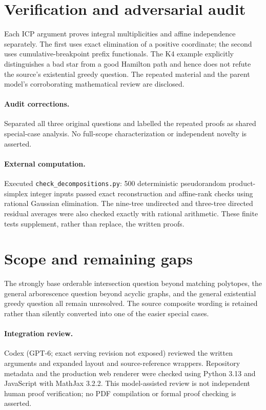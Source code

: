 \documentclass[11pt]{article}
\begin{document}
\section{Verification and adversarial audit}
Each ICP argument proves integral multiplicities and affine independence separately. The first uses exact elimination of a positive coordinate; the second uses cumulative-breakpoint prefix functionals. The K4 example explicitly distinguishes a bad star from a good Hamilton path and hence does not refute the source's existential greedy question. The repeated material and the parent model's corroborating mathematical review are disclosed.
\paragraph{Audit corrections.} Separated all three original questions and labelled the repeated proofs as shared special-case analysis. No full-scope characterization or independent novelty is asserted.
\paragraph{External computation.} Executed \texttt{check\_decompositions.py}: 500 deterministic pseudorandom product-simplex integer inputs passed exact reconstruction and affine-rank checks using rational Gaussian elimination. The nine-tree undirected and three-tree directed residual averages were also checked exactly with rational arithmetic. These finite tests supplement, rather than replace, the written proofs.
\section{Scope and remaining gaps}
The strongly base orderable intersection question beyond matching polytopes, the general arborescence question beyond acyclic graphs, and the general existential greedy question all remain unresolved. The source composite wording is retained rather than silently converted into one of the easier special cases.
\paragraph{Integration review.} Codex (GPT-6; exact serving revision not exposed) reviewed the written arguments and expanded layout and source-reference wrappers. Repository metadata and the production web renderer were checked using Python 3.13 and JavaScript with MathJax 3.2.2. This model-assisted review is not independent human proof verification; no PDF compilation or formal proof checking is asserted.
\end{document}
